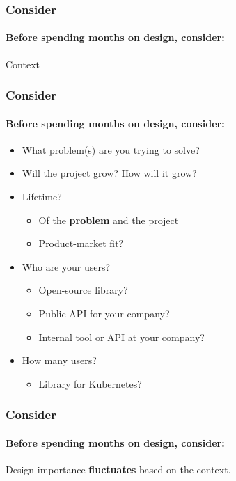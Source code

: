 
\begin{frame}
  \frametitle{Consider}
  \framesubtitle{Before spending months on design, consider:}

  \centering
  \LARGE Context
\end{frame}

\begin{frame}
  \frametitle{Consider}
  \framesubtitle{Before spending months on design, consider:}

  \begin{itemize}
    \item What problem(s) are you trying to solve?
    \pause
    \item Will the project grow? How will it grow?
    \pause
    \item Lifetime?
    \begin{itemize}
      \item Of the \textbf{problem} and the project
      \item Product-market fit?
    \end{itemize}
    \pause
    \item Who are your users?
    \begin{itemize}
      \item Open-source library?
      \item Public API for your company?
      \item Internal tool or API at your company?
    \end{itemize}
    \pause
    \item How many users?
    \begin{itemize}
      \item Library for Kubernetes?
    \end{itemize}
\end{itemize}
\end{frame}

\begin{frame}
  \frametitle{Consider}
  \framesubtitle{Before spending months on design, consider:}

  \centering
  Design importance \textbf{fluctuates} based on the context.
\end{frame}
